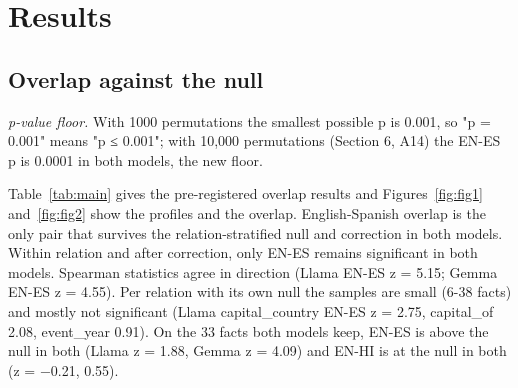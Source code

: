 \documentclass[11pt]{article}
\begin{document}
\section{Results}


\subsection{Overlap against the null}
\emph{p-value floor.} With 1000 permutations the smallest possible p is 0.001, so "p = 0.001" means "p ≤ 0.001"; with 10,000 permutations (Section 6, A14) the EN-ES p is 0.0001 in both models, the new floor.

Table~\ref{tab:main} gives the pre-registered overlap results and Figures~\ref{fig:fig1} and~\ref{fig:fig2} show the profiles and the overlap. English-Spanish overlap is the only pair that survives the relation-stratified null and correction in both models. Within relation and after correction, only EN-ES remains significant in both models. Spearman statistics agree in direction (Llama EN-ES z = 5.15; Gemma EN-ES z = 4.55). Per relation with its own null the samples are small (6-38 facts) and mostly not significant (Llama capital\_country EN-ES z = 2.75, capital\_of 2.08, event\_year 0.91). On the 33 facts both models keep, EN-ES is above the null in both (Llama z = 1.88, Gemma z = 4.09) and EN-HI is at the null in both (z = −0.21, 0.55).
\end{document}
